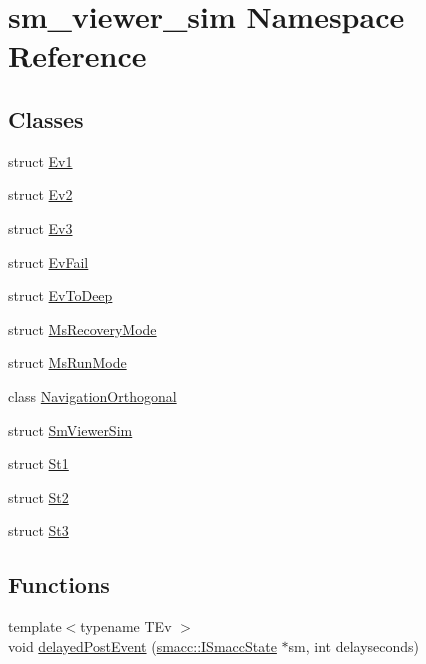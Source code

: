 \hypertarget{namespacesm__viewer__sim}{}\section{sm\+\_\+viewer\+\_\+sim Namespace Reference}
\label{namespacesm__viewer__sim}
\subsection*{Classes}
\begin{DoxyCompactItemize}
\item 
struct \hyperlink{structsm__viewer__sim_1_1Ev1}{Ev1}
\item 
struct \hyperlink{structsm__viewer__sim_1_1Ev2}{Ev2}
\item 
struct \hyperlink{structsm__viewer__sim_1_1Ev3}{Ev3}
\item 
struct \hyperlink{structsm__viewer__sim_1_1EvFail}{Ev\+Fail}
\item 
struct \hyperlink{structsm__viewer__sim_1_1EvToDeep}{Ev\+To\+Deep}
\item 
struct \hyperlink{structsm__viewer__sim_1_1MsRecoveryMode}{Ms\+Recovery\+Mode}
\item 
struct \hyperlink{structsm__viewer__sim_1_1MsRunMode}{Ms\+Run\+Mode}
\item 
class \hyperlink{classsm__viewer__sim_1_1NavigationOrthogonal}{Navigation\+Orthogonal}
\item 
struct \hyperlink{structsm__viewer__sim_1_1SmViewerSim}{Sm\+Viewer\+Sim}
\item 
struct \hyperlink{structsm__viewer__sim_1_1St1}{St1}
\item 
struct \hyperlink{structsm__viewer__sim_1_1St2}{St2}
\item 
struct \hyperlink{structsm__viewer__sim_1_1St3}{St3}
\end{DoxyCompactItemize}
\subsection*{Functions}
\begin{DoxyCompactItemize}
\item 
{\footnotesize template$<$typename T\+Ev $>$ }\\void \hyperlink{namespacesm__viewer__sim_a19b5db17983d5b9bbf21e96ecf9ab5c8}{delayed\+Post\+Event} (\hyperlink{classsmacc_1_1ISmaccState}{smacc\+::\+I\+Smacc\+State} $\ast$sm, int delayseconds)
\end{DoxyCompactItemize}


